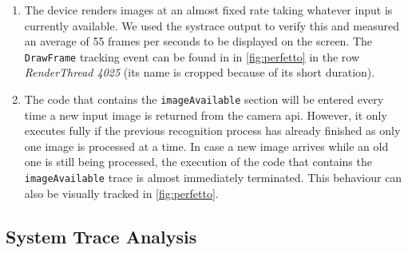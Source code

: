 \documentclass[
			   fontsize=11pt,
               paper=a4,
               bibliography=totoc,
               idxtotoc,
               headsepline,
               footsepline,
               footinclude=false,
               BCOR=12mm,
               DIV=13,
               openany,   %
               ]
               {scrbook}
\newcommand{\code}[1]{\lstinline[basicstyle = \ttfamily\small]{#1}} %
\begin{document}
\begin{enumerate}
	\item The device renders images at an almost fixed rate taking whatever input is currently available. We used the systrace output to verify this and measured an average of 55 frames per seconds to be displayed on the screen. The \code{DrawFrame} tracking event can be found in in \autoref{fig:perfetto} in the row \textit{RenderThread 4025} (its name is cropped because of its short duration).
	\item The code that contains the \code{imageAvailable} section will be entered every time a new input image is returned from the camera \gls{api}. However, it only executes fully if the previous recognition process has already finished as only one image is processed at a time. In case a new image arrives while an old one is still being processed, the execution of the code that contains the \code{imageAvailable} trace is almost immediately terminated. This behaviour can also be visually tracked in \autoref{fig:perfetto}.
\end{enumerate}

\subsection{System Trace Analysis}
\end{document}
